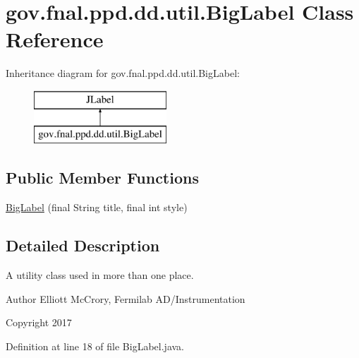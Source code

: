 \hypertarget{classgov_1_1fnal_1_1ppd_1_1dd_1_1util_1_1BigLabel}{\section{gov.\-fnal.\-ppd.\-dd.\-util.\-Big\-Label Class Reference}
\label{classgov_1_1fnal_1_1ppd_1_1dd_1_1util_1_1BigLabel}
}
Inheritance diagram for gov.\-fnal.\-ppd.\-dd.\-util.\-Big\-Label\-:\begin{figure}[H]
\begin{center}
\leavevmode
\includegraphics[height=2.000000cm]{classgov_1_1fnal_1_1ppd_1_1dd_1_1util_1_1BigLabel}
\end{center}
\end{figure}
\subsection*{Public Member Functions}
\begin{DoxyCompactItemize}
\item 
\hyperlink{classgov_1_1fnal_1_1ppd_1_1dd_1_1util_1_1BigLabel_a325ac92799bf54125230e3cd672d8bc8}{Big\-Label} (final String title, final int style)
\end{DoxyCompactItemize}


\subsection{Detailed Description}
A utility class used in more than one place.

\begin{DoxyAuthor}{Author}
Elliott Mc\-Crory, Fermilab A\-D/\-Instrumentation 
\end{DoxyAuthor}
\begin{DoxyCopyright}{Copyright}
2017 
\end{DoxyCopyright}


Definition at line 18 of file Big\-Label.\-java.




